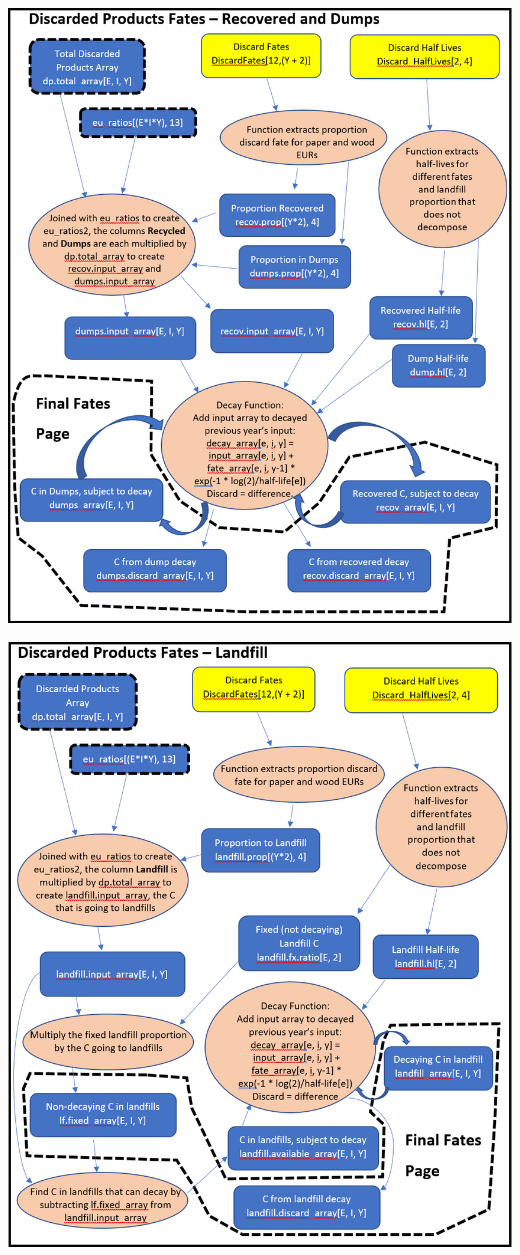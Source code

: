 \documentclass[
]{book}
\begin{document}
\newpage

\includegraphics[width=1\linewidth]{images/schematic-5}

\newpage

\includegraphics[width=1\linewidth]{images/schematic-6}
\end{document}
